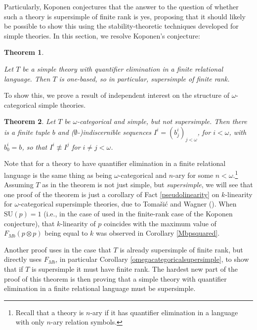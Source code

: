 \documentclass[11pt]{amsart}
\newtheorem{theorem}{Theorem}[section]
\theoremstyle{definition}
\theoremstyle{remark}
\numberwithin{equation}{section}
\begin{document}
Particularly, Koponen conjectures that the answer to the question of whether such a theory is supersimple of finite rank is yes, proposing that it should likely be possible to show this using the stability-theoretic techniques developed for simple theories. In this section, we resolve Koponen's conjecture: 

\begin{theorem}
\label{koponen}
    
    Let $T$ be a simple theory with quantifier elimination in a finite relational language. Then $T$ is one-based, so in particular, supersimple of finite rank.
\end{theorem}

To show this, we prove a result of independent interest on the structure of $\omega$-categorical simple theories.


\begin{theorem}\label{omegacategoricalsimplebutnotsupersimple}
    Let $T$ be $\omega$-categorical and simple, but not supersimple. Then there is a finite tuple $b$ and ($\emptyset$-)indiscernible sequences $I^{i}=(b^{i}_{j})_{j < \omega}$, for $i < \omega$, with $b^{i}_{0} = b$, so that $I^{i} \not\equiv I^{j}$ for $i \neq j < \omega$.
\end{theorem}

Note that for a theory to have quantifier elimination in a finite relational language is the same thing as being $\omega$-categorical and $n$-ary for some $n < \omega$.\footnote{Recall that a theory is $n$-ary if it has quantifier elimination in a language with only $n$-ary relation symbols.} Assuming $T$ as in the theorem is not just simple, but \textit{supersimple}, we will see that one proof of the theorem is just a corollary of Fact \ref{pseudolinearity} on $k$-linearity for $\omega$-categorical supersimple theories, due to Tomašić and Wagner (\cite{TW03}). When $\mathrm{SU}(p) = 1$ (i.e., in the case of \cite{TW03} used in the finite-rank case of the Koponen conjecture), that $k$-linearity of $p$ coincides with the maximum value of $F_{Mb}(p \otimes p)$ being equal to $k$ was observed in Corollary \ref{Mbpsquared}.

Another proof uses \cite{TW03} in the case that $T$ is already supersimple of finite rank, but directly uses $F_{Mb}$, in particular Corollary \ref{omegacategoricalsupersimple}, to show that if $T$ is supersimple it must have finite rank. The hardest new part of the proof of this theorem is then proving that a simple theory with quantifier elimination in a finite relational language must be supersimple. 
\end{document}
